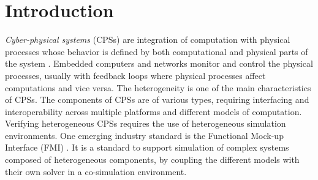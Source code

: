 \section{Introduction}

\textit{Cyber-physical systems} (CPSs) are integration of computation with physical processes whose behavior is defined by both computational and physical parts of the system \cite{Zanero17}. Embedded computers and networks monitor and control the physical processes, usually with feedback loops where physical processes affect computations and vice versa. The heterogeneity is one of the main characteristics of CPSs. The components of CPSs are of various types, requiring interfacing and interoperability across multiple platforms and different models of computation. Verifying  heterogeneous CPSs requires the use of heterogeneous simulation environments. One emerging industry standard is the Functional Mock-up Interface (FMI) \cite{Blochwitz2011The}\cite{BromanBGLMTW13}. It is a standard to support simulation of complex systems composed of heterogeneous components, by coupling the different models with their own solver in a co-simulation environment.

